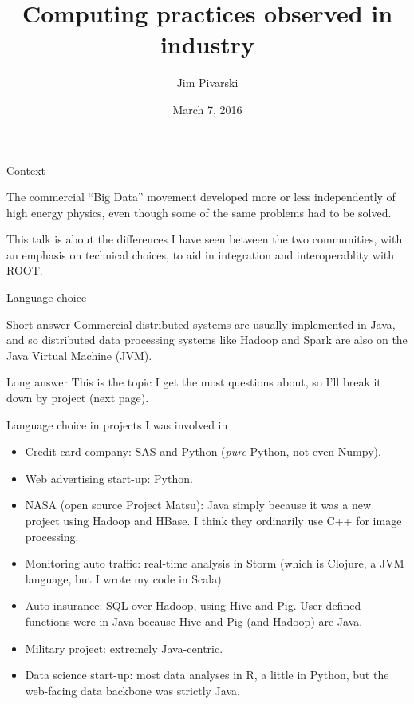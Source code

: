 \documentclass{beamer}
\title[2016-03-07-rootteam-hadoop]{Computing practices observed in industry}
\author{Jim Pivarski}
\institute{Princeton University -- DIANA}
\date{March 7, 2016}
\begin{document}
\begin{frame}
  \titlepage
\end{frame}

\begin{frame}{Context}

\begin{block}{}
The commercial ``Big Data'' movement developed more or less independently of high energy physics, even though some of the same problems had to be solved.
\end{block}

\begin{block}{}
This talk is about the differences I have seen between the two communities, with an emphasis on technical choices, to aid in integration and interoperablity with ROOT.
\end{block}
\end{frame}

\begin{frame}{Language choice}
\begin{block}{Short answer}
Commercial distributed systems are usually implemented in Java, and so distributed data processing systems like Hadoop and Spark are also on the Java Virtual Machine (JVM).
\end{block}

\begin{block}{Long answer}
This is the topic I get the most questions about, so I'll break it down by project (next page).
\end{block}
\end{frame}

\begin{frame}{Language choice in projects I was involved in}
\begin{itemize}
\item Credit card company: SAS and Python ({\it pure} Python, not even Numpy).

\item Web advertising start-up: Python.

\item NASA (open source Project Matsu): Java simply because it was a new project using Hadoop and HBase. I think they ordinarily use C++ for image processing.

\item Monitoring auto traffic: real-time analysis in Storm (which is Clojure, a JVM language, but I wrote my code in Scala).

\item Auto insurance: SQL over Hadoop, using Hive and Pig. User-defined functions were in Java because Hive and Pig (and Hadoop) are Java.

\item Military project: extremely Java-centric.

\item Data science start-up: most data analyses in R, a little in Python, but the web-facing data backbone was strictly Java.
\end{itemize}
\end{frame}
\end{document}
